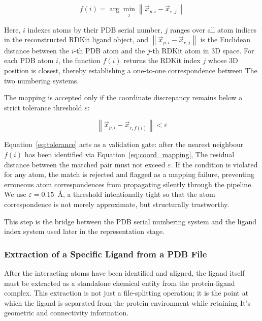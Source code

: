 \documentclass[a4paper,12pt]{article}
\begin{document}
\begin{equation}
    f(i) = \arg\min_{j} \left\| \vec{x}_{p,i} - \vec{x}_{r,j} \right\|
    \label{eq:coord_mapping}
\end{equation}

\noindent
Here, $i$ indexes atoms by their PDB serial number, $j$ ranges over all atom
indices in the reconstructed RDKit ligand object, and
$\left\| \vec{x}_{p,i} - \vec{x}_{r,j} \right\|$ is the Euclidean distance
between the $i$-th PDB atom and the $j$-th RDKit atom in 3D space. For each
PDB atom $i$, the function $f(i)$ returns the RDKit index $j$ whose 3D
position is closest, thereby establishing a one-to-one correspondence between
The two numbering systems.

The mapping is accepted only if the coordinate discrepancy remains below a
strict tolerance threshold $\varepsilon$:

\begin{equation}
    \left\| \vec{x}_{p,i} - \vec{x}_{r,f(i)} \right\| < \varepsilon
    \label{eq:tolerance}
\end{equation}

\noindent
Equation~\ref{eq:tolerance} acts as a validation gate: after the nearest
neighbour $f(i)$ has been identified via Equation~\ref{eq:coord_mapping}, The 
residual distance between the matched pair must not exceed $\varepsilon$.
If the condition is violated for any atom, the match is rejected and flagged
as a mapping failure, preventing erroneous atom correspondences from
propagating silently through the pipeline. We use $\varepsilon = 0.15$~\AA,
a threshold intentionally tight so that the atom correspondence is not merely
approximate, but structurally trustworthy.

This step is the bridge between the PDB serial
numbering system and the ligand index system used later in the representation
stage.


\subsubsection{Extraction of a Specific Ligand from a PDB File}

After the interacting atoms have been identified and aligned, the ligand itself
must be extracted as a standalone chemical entity from the protein-ligand
complex. This extraction is not just a file-splitting operation; it is the point
at which the ligand is separated from the protein environment while retaining
It's geometric and connectivity information.
\end{document}
